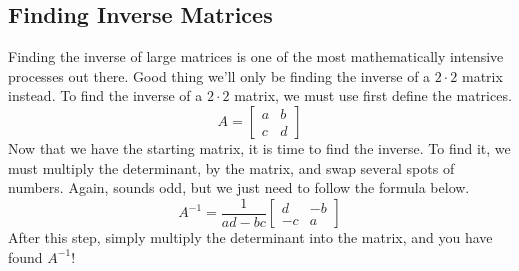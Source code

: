     \subsection{Finding Inverse Matrices}
        Finding the inverse of large matrices is one of the most mathematically intensive processes out there.
        Good thing we'll only be finding the inverse of a $2\cdot2$ matrix instead. To find the inverse of a $2\cdot 2$ matrix, we must use first define the matrices.
        \begin{equation*}
        A = 
            \begin{bmatrix}
                a & b\\
                c & d
            \end{bmatrix}
        \end{equation*}
        Now that we have the starting matrix, it is time to find the inverse. To find it, we must multiply the determinant, by the matrix, and swap several spots of numbers. Again, sounds odd, but we just need to follow the formula below.
        \begin{equation*}
        A^{-1} = \frac{1}{ad-bc}
            \begin{bmatrix}
                d & -b\\
                -c & a
            \end{bmatrix}
        \end{equation*}
        After this step, simply multiply the determinant into the matrix, and you have found $A^{-1}$!